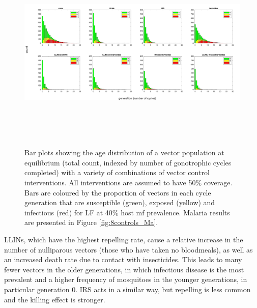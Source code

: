 \begin{figure} 
\includegraphics[height=9.7cm]{Project/Figures/VectorModel/LF/populationhist_8controls.png}
\caption[Age distribution with infection (vector count).]{Bar plots showing the age distribution of a vector population at equilibrium (total count, indexed by number of gonotrophic cycles completed) with a variety of combinations of vector control interventions. All interventions are assumed to have 50\% coverage. Bars are coloured by the proportion of vectors in each cycle generation that are susceptible (green), exposed (yellow) and infectious (red) for LF at 40\% host mf prevalence. Malaria results are presented in Figure \ref{fig:8controls_Ma}.}
\label{fig:8controls_LF}
\end{figure} 

LLINs, which have the highest repelling rate, cause a relative increase in the number of \gls{nulliparous} vectors (those who have taken no bloodmeals), as well as an increased death rate due to contact with insecticides. This leads to many fewer vectors in the older generations, in which infectious disease is the most prevalent and a higher frequency of mosquitoes in the younger generations, in particular generation $0$. IRS acts in a similar way, but repelling is less common and the killing effect is stronger. 

